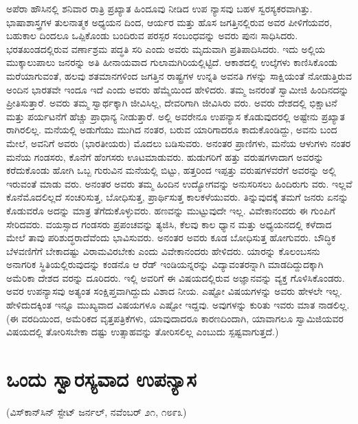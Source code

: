 ಅಪೆರಾ ಹೌಸಿನಲ್ಲಿ ಶನಿವಾರ ರಾತ್ರಿ ಪ್ರಖ್ಯಾತ ಹಿಂದೂವು ನೀಡಿದ ಉಪ ನ್ಯಾಸವು ಬಹಳ ಸ್ವರಸ್ಯಕರವಾಗಿತ್ತು. ಭಾಷಾಶಾಸ್ತ್ರಗಳ ತುಲನಾತ್ಮಕ ಅಧ್ಯಯನ ದಿಂದ, ಆರ್ಯರ ಮತ್ತು ಹೊಸ ಜಗತ್ತಿನಲ್ಲಿರುವ ಅವರ ಪೀಳಿಗೆಯವರ, ಬಹುಕಾಲ ದಿಂದಲೂ ಒಪ್ಪಿಕೊಂಡು ಬಂದಿರುವ ಪರಸ್ಪರ ಸಂಬಂಧವನ್ನು ಅವರು ಪುನಃ ಸಾಧಿಸಿದರು. ಭರತಖಂಡದಲ್ಲಿರುವ ವರ್ಣಾಶ್ರಮ ಪದ್ಧತಿ ಸರಿ ಎಂದು ಅವರು ಮೃದುವಾಗಿ ಪ್ರತಿಪಾದಿಸಿದರು. ಇದು ಅಲ್ಲಿಯ ಮುಕ್ಕಾಲುಪಾಲು ಜನರನ್ನು ಅತಿ ಹೀನಾಯವಾದ ಗುಲಾಮಗಿರಿಯಲ್ಲಿಟ್ಟಿದೆ. ಆಕಾಶದಲ್ಲಿ ಉಲ್ಕೆಗಳು ಕಾಣಿಸಿಕೊಂಡು ಮರೆಯಾಗುವಂತೆ, ಹಲವು ಶತಮಾನಗಳಿಂದ ಜಗತ್ತಿನ ರಾಷ್ಟ್ರಗಳ ಉನ್ನತಿ ಅವನತಿ ಗಳನ್ನು ಸಾಕ್ಷಿಯಂತೆ ನೋಡುತ್ತಿರುವ ಅಂದಿನ ಭಾರತವೇ ಇಂದೂ ಇದೆ ಎಂದು ಅವರು ಹೆಮ್ಮೆಯಿಂದ ಹೇಳಿದರು. ತಮ್ಮ ಜನರಂತೆ ಸ್ವಾಮೀಜಿ ಹಿಂದಿನದನ್ನು ಪ್ರೀತಿಸುತ್ತಾರೆ. ಅವರು ತಮ್ಮ ಸ್ವಾರ್ಥಕ್ಕಾಗಿ ಜೀವಿಸಿಲ್ಲ, ದೇವರಿಗಾಗಿ ಜೀವಿಸಿರು ವರು. ಅವರು ದೇಶದಲ್ಲಿ ಭಿಕ್ಷಾಟನೆ ಮತ್ತು ಪರ್ಯಟನೆಗೆ ಹೆಚ್ಚು ಪ್ರಾಧಾನ್ಯ ನೀಡುತ್ತಾರೆ. ಅಲ್ಲಿ ಅವರೇನೂ ಉಪನ್ಯಾಸ ಕೊಡುವುದರಲ್ಲಿ ಅಷ್ಟೇನು ಪ್ರಖ್ಯಾತ ರಾಗಿರಲಿಲ್ಲ. ಮನೆಯಲ್ಲಿ ಅಡುಗೆಯು ಮುಗಿದ ನಂತರ, ಬರುವ ಯಾರಿಗಾದರೂ ಕಾದುಕೊಂಡಿದ್ದು, ಅವನು ಬಂದ ಮೇಲೆ, ಅವನಿಗೆ ಅವರು (ಭಾರತೀಯರು) ಮೊದಲು ಬಡಿಸುವರು. ಅನಂತರ ಪ್ರಾಣಿಗಳು, ಮನೆಯ ಆಳುಗಳು ನಂತರ ಮನೆಯ ಗಂಡಸರು, ಕೊನೆಗೆ ಹೆಂಗಸರು ಊಟಮಾಡುವರು. ಹುಡುಗರಿಗೆ ಹತ್ತು ವರುಷಗಳಾದಾಗ ಅವರನ್ನು ಕರೆದುಕೊಂಡು ಹೋಗಿ ಒಬ್ಬ ಗುರುವಿನ ಮನೆಯಲ್ಲಿ ಬಿಟ್ಟು, ಹತ್ತರಿಂದ ಇಪ್ಪತ್ತು ವರುಷಗಳವರೆಗೆ ಅವರನ್ನು ಅಲ್ಲಿ ಇರುವಂತೆ ಮಾಡು ವರು. ಅನಂತರ ಅವರು ತಮ್ಮ ಹಿಂದಿನ ಉದ್ಯೋಗವನ್ನು ಅನುಸರಿಸಲು ಹಿಂದಿರುಗು ವರು. ಇಲ್ಲವೆ ಕೊನೆಮೊದಲಿಲ್ಲದೆ ಸಂಚರಿಸುತ್ತ, ಬೋಧಿಸುತ್ತ, ಪ್ರಾರ್ಥಿಸುತ್ತ ಕಾಲಕಳೆಯುವರು. ತಿನ್ನುವುದಕ್ಕೆ ತಮಗೆ ಜನರು ಏನನ್ನು ಕೊಡುವರೊ ಅದನ್ನು ಮಾತ್ರ ತೆಗೆದುಕೊಳ್ಳುವರು. ಹಣವನ್ನು ಮುಟ್ಟುವುದೇ ಇಲ್ಲ. ವಿವೇಕಾನಂದರು ಈ ಗುಂಪಿಗೆ ಸೇರಿದವರು. ವಯಸ್ಸಾದ ಗಂಡಸರು ಪ್ರಪಂಚವನ್ನು ತ್ಯಜಿಸಿ, ಕೆಲವು ಕಾಲ ಧ್ಯಾನ ಮತ್ತು ಅಧ್ಯಯನದಲ್ಲಿ ಕಳೆದಾದ ಮೇಲೆ ತಾವು ಪರಿಶುದ್ಧರಾದೆವೆಂದು ಭಾವಿಸುವರು. ಅನಂತರ ಅವರು ಕೂಡ ಬೋಧಿಸುತ್ತ ಹೋಗುವರು. ಬೌದ್ಧಿಕ ಬೆಳವಣಿಗೆಗೆ ಬೇಕಾದಷ್ಟು ವಿರಾಮವಿರಬೇಕು ಎಂದು ವಿವೇಕಾನಂದರು ಹೇಳಿದರು. ಯಾರನ್ನು ಕೊಲಂಬಸನು ಅನಾಗರಿಕ ಸ್ಥಿತಿಯಲ್ಲಿರುವುದನ್ನು ಕಂಡನೊ ಆ ರೆಡ್​ ಇಂಡಿಯನ್ನರನ್ನು ವಿದ್ಯಾವಂತರನ್ನಾಗಿ ಮಾಡದಿದ್ದುದಕ್ಕಾಗಿ ಅಮೆರಿಕಾ ದೇಶದ ವರನ್ನು ದೂರಿದರು. ಇಲ್ಲಿ ಅವರಿಗೆ ಈ ವಿಷಯದಲ್ಲಿರುವ ಅಜ್ಞಾನವನ್ನು ವ್ಯಕ್ತ ಗೊಳಿಸಿಕೊಂಡರು. ಅವರ ಉಪನ್ಯಾಸವು ಅತ್ಯಂತ ಸಂಕ್ಷಿಪ್ತವಾಗಿದ್ದುದು ವಿಶಾದ ನೀಯ. ಎಷ್ಟೋ ವಿಷಯಗಳನ್ನು ಅವರು ಹೇಳಲೇ ಇಲ್ಲ. ಹೇಳಿದುದಕ್ಕಿಂತ ಇನ್ನೂ ಮುಖ್ಯವಾದ ವಿಷಯಗಳೂ ಎಷ್ಟೋ ಇದ್ದವು. ಅವುಗಳನ್ನು ಕುರಿತು ಇವರು ಮಾತ ನಾಡಲಿಲ್ಲ. (ಈ ವರದಿಯಿಂದ, ಅಮೆರಿಕದ ವೃತ್ತಪತ್ರಿಕೆಗಳು, ಯಾವುದಾದರೂ ಕಾರಣದಿಂದಾಗಿ, ಯಾವಾಗಲೂ ಸ್ವಾಮಿಜಿಯವರ ವಿಷಯದಲ್ಲಿ ತೋರಿಸಬೇಕಾ ದಷ್ಟು ಉತ್ಸಾಹವನ್ನು ತೋರಿಸಲಿಲ್ಲ ಎಂಬುದು ಸ್ಪಷ್ಟವಾಗುತ್ತದೆ.)


\section{ಒಂದು ಸ್ವಾರಸ್ಯವಾದ ಉಪನ್ಯಾಸ}

\begin{center}
(ವಿಸ್​ಕಾನ್​ಸಿನ್​ ಸ್ಟೇಟ್​ ಜರ್ನಲ್​, ನವೆಂಬರ್​ ೨೧, ೧೮೯೩)
\end{center}

